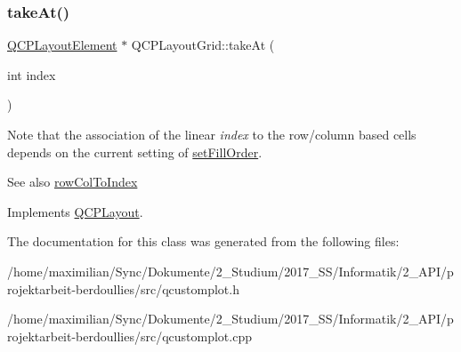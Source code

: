 \mbox{\label{class_q_c_p_layout_grid_a17dd220234d1bbf8835abcc666384d45}} 
\subsubsection{\texorpdfstring{take\+At()}{takeAt()}}
{\footnotesize\ttfamily \hyperlink{class_q_c_p_layout_element}{Q\+C\+P\+Layout\+Element} $\ast$ Q\+C\+P\+Layout\+Grid\+::take\+At (\begin{DoxyParamCaption}\item[{int}]{index }\end{DoxyParamCaption})\hspace{0.3cm}{\ttfamily [virtual]}}

Note that the association of the linear {\itshape index} to the row/column based cells depends on the current setting of \hyperlink{class_q_c_p_layout_grid_affc2f3cfd22f28698c5b29b960d2a391}{set\+Fill\+Order}.

\begin{DoxySeeAlso}{See also}
\hyperlink{class_q_c_p_layout_grid_a682ba76f130810ffd294032a1bfbcfcb}{row\+Col\+To\+Index} 
\end{DoxySeeAlso}


Implements \hyperlink{class_q_c_p_layout_a5a79621fa0a6eabb8b520cfc04fb601a}{Q\+C\+P\+Layout}.



The documentation for this class was generated from the following files\+:\begin{DoxyCompactItemize}
\item 
/home/maximilian/\+Sync/\+Dokumente/2\+\_\+\+Studium/2017\+\_\+\+S\+S/\+Informatik/2\+\_\+\+A\+P\+I/projektarbeit-\/berdoullies/src/qcustomplot.\+h\item 
/home/maximilian/\+Sync/\+Dokumente/2\+\_\+\+Studium/2017\+\_\+\+S\+S/\+Informatik/2\+\_\+\+A\+P\+I/projektarbeit-\/berdoullies/src/qcustomplot.\+cpp\end{DoxyCompactItemize}
